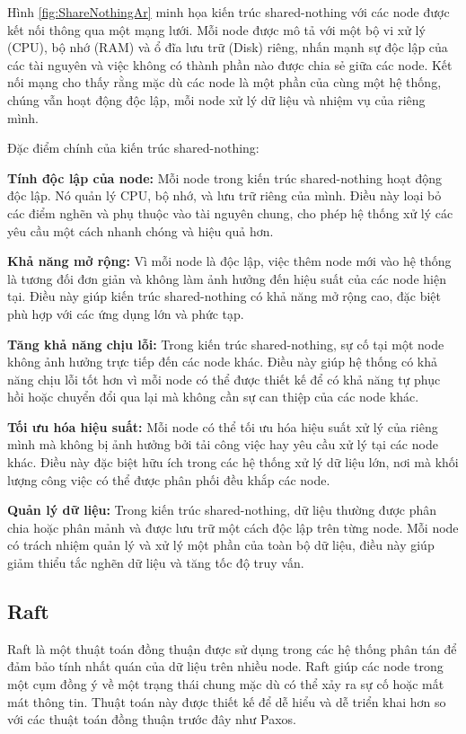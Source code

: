 \documentclass[50pt]{extarticle}
\begin{document}
Hình \ref{fig:ShareNothingAr} minh họa kiến trúc shared-nothing với các node được kết nối thông qua một mạng lưới. Mỗi node được mô tả với một bộ vi xử lý (CPU), bộ nhớ (RAM) và ổ đĩa lưu trữ (Disk) riêng, nhấn mạnh sự độc lập của các tài nguyên và việc không có thành phần nào được chia sẻ giữa các node. Kết nối mạng cho thấy rằng mặc dù các node là một phần của cùng một hệ thống, chúng vẫn hoạt động độc lập, mỗi node xử lý dữ liệu và nhiệm vụ của riêng mình.

Đặc điểm chính của kiến trúc shared-nothing:

\textbf{Tính độc lập của node:} Mỗi node trong kiến trúc shared-nothing hoạt động độc lập. Nó quản lý CPU, bộ nhớ, và lưu trữ riêng của mình. Điều này loại bỏ các điểm nghẽn và phụ thuộc vào tài nguyên chung, cho phép hệ thống xử lý các yêu cầu một cách nhanh chóng và hiệu quả hơn.

\textbf{Khả năng mở rộng:} Vì mỗi node là độc lập, việc thêm node mới vào hệ thống là tương đối đơn giản và không làm ảnh hưởng đến hiệu suất của các node hiện tại. Điều này giúp kiến trúc shared-nothing có khả năng mở rộng cao, đặc biệt phù hợp với các ứng dụng lớn và phức tạp.

\textbf{Tăng khả năng chịu lỗi:} Trong kiến trúc shared-nothing, sự cố tại một node không ảnh hưởng trực tiếp đến các node khác. Điều này giúp hệ thống có khả năng chịu lỗi tốt hơn vì mỗi node có thể được thiết kế để có khả năng tự phục hồi hoặc chuyển đổi qua lại mà không cần sự can thiệp của các node khác.

\textbf{Tối ưu hóa hiệu suất:} Mỗi node có thể tối ưu hóa hiệu suất xử lý của riêng mình mà không bị ảnh hưởng bởi tải công việc hay yêu cầu xử lý tại các node khác. Điều này đặc biệt hữu ích trong các hệ thống xử lý dữ liệu lớn, nơi mà khối lượng công việc có thể được phân phối đều khắp các node.

\textbf{Quản lý dữ liệu:} Trong kiến trúc shared-nothing, dữ liệu thường được phân chia hoặc phân mảnh và được lưu trữ một cách độc lập trên từng node. Mỗi node có trách nhiệm quản lý và xử lý một phần của toàn bộ dữ liệu, điều này giúp giảm thiểu tắc nghẽn dữ liệu và tăng tốc độ truy vấn.

\subsection{Raft}

Raft \cite{ongaro2014raft} là một thuật toán đồng thuận được sử dụng trong các hệ thống phân tán để đảm bảo tính nhất quán của dữ liệu trên nhiều node. Raft giúp các node trong một cụm đồng ý về một trạng thái chung mặc dù có thể xảy ra sự cố hoặc mất mát thông tin. Thuật toán này được thiết kế để dễ hiểu và dễ triển khai hơn so với các thuật toán đồng thuận trước đây như Paxos.
\end{document}

